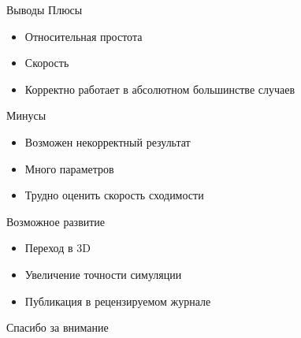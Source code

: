 \documentclass{beamer}
\theoremstyle{plain}
\begin{document}
\begin{frame}{Выводы}
  Плюсы
  \begin{itemize}
    \item Относительная простота
    \item Скорость
    \item Корректно работает в абсолютном большинстве случаев
  \end{itemize}

  Минусы
  \begin{itemize}
    \item Возможен некорректный результат
    \item Много параметров
    \item Трудно оценить скорость сходимости
  \end{itemize}
\end{frame}

\begin{frame}{Возможное развитие}
  \begin{itemize}
    \item Переход в 3D
    \item Увеличение точности симуляции
    \item Публикация в рецензируемом журнале
  \end{itemize}
\end{frame}

\begin{frame}
  \begin{center}
  \LARGE{Спасибо за внимание}
  \end{center}
\end{frame}
\end{document}
